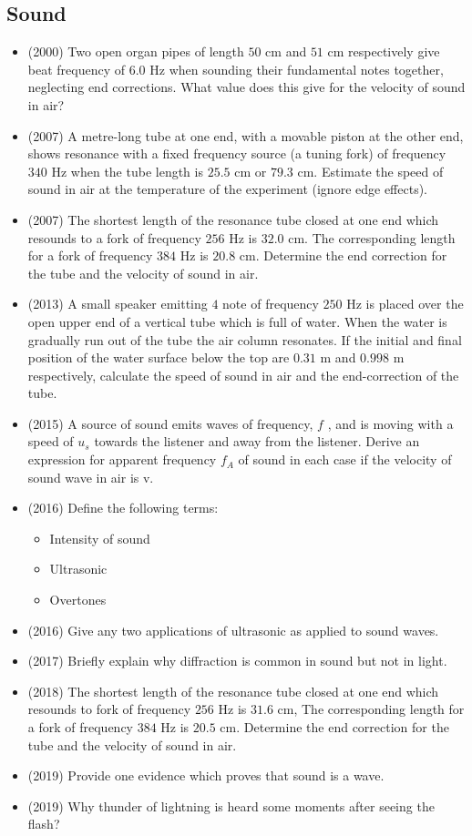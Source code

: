\documentclass{article}
\begin{document}
\subsection{Sound}
\begin{itemize}
\item (2000)  Two open organ pipes of length $ 50$ cm and $ 51$ cm respectively give beat frequency of $ 6.0$ Hz when sounding their fundamental notes together, neglecting end corrections. What value does this give for the velocity of sound in air?
\item (2007)  A metre-long tube at one end, with a movable piston at the other end, shows resonance with a fixed frequency source (a tuning fork) of frequency $ 340$ Hz when the tube length is $ 25.5$ cm or $ 79.3$ cm.  Estimate the speed of sound in air at the temperature of the experiment (ignore edge effects).
\item (2007)  The shortest length of the resonance tube closed at one end which resounds to a fork of frequency $ 256$ Hz is $ 32.0$ cm.  The corresponding length for a fork of frequency $ 384$ Hz is $ 20.8$ cm.  Determine the end correction for the tube and the velocity of sound in air.
\item (2013)  A small speaker emitting $ 4$ note of frequency $ 250$ Hz is placed over the open upper end of a vertical tube which is full of water. When the water is gradually run out of the tube the air column resonates. If the initial and final position of the water surface below the top are $ 0.31$ m and $ 0.998$ m respectively, calculate the speed of sound in air and the end-correction of the tube. 
\item (2015)  A source of sound emits waves of frequency, $ f$ , and is moving with a speed of $ u_{s}$ towards the listener and away from the listener.  Derive an expression for apparent frequency $ f_{A}$ of sound in each case if the velocity of sound wave in air is v.  
\item (2016)  Define the following terms:\begin{itemize}
\item Intensity of sound
\item Ultrasonic
\item Overtones
\end{itemize}
\item (2016)  Give any two applications of ultrasonic as applied to sound waves.
\item (2017)  Briefly explain why diffraction is common in sound but not in light.
\item (2018)  The shortest length of the resonance tube closed at one end which resounds to fork of frequency $ 256$ Hz is $ 31.6$ cm, The corresponding length for a fork of frequency $ 384$ Hz is $ 20.5$ cm. Determine the end correction for the tube and the velocity of sound in air. 
\item (2019)  Provide one evidence which proves that sound is a wave.
\item (2019)  Why thunder of lightning is heard some moments after seeing the flash?
\end{itemize}
\end{document}
